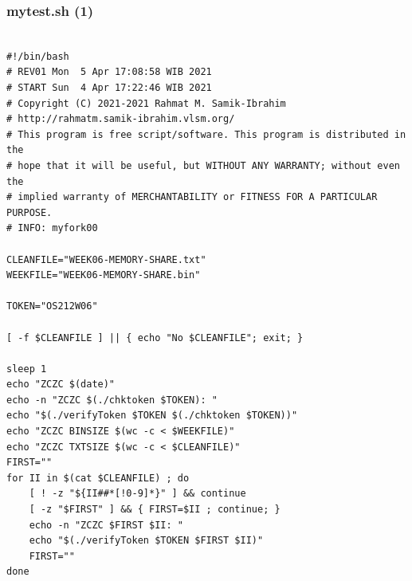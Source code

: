 \documentclass[xcolor=table, notheorems, hyperref={pdfpagelabels=false}]{beamer}
\begin{document}
\begin{frame}[fragile]
\frametitle{mytest.sh (1)}
\begin{lstlisting}[basicstyle=\ttfamily\tiny]         % 108

#!/bin/bash
# REV01 Mon  5 Apr 17:08:58 WIB 2021
# START Sun  4 Apr 17:22:46 WIB 2021
# Copyright (C) 2021-2021 Rahmat M. Samik-Ibrahim
# http://rahmatm.samik-ibrahim.vlsm.org/
# This program is free script/software. This program is distributed in the 
# hope that it will be useful, but WITHOUT ANY WARRANTY; without even the 
# implied warranty of MERCHANTABILITY or FITNESS FOR A PARTICULAR PURPOSE.
# INFO: myfork00

CLEANFILE="WEEK06-MEMORY-SHARE.txt"
WEEKFILE="WEEK06-MEMORY-SHARE.bin"

TOKEN="OS212W06"

[ -f $CLEANFILE ] || { echo "No $CLEANFILE"; exit; }

sleep 1
echo "ZCZC $(date)"
echo -n "ZCZC $(./chktoken $TOKEN): "
echo "$(./verifyToken $TOKEN $(./chktoken $TOKEN))"
echo "ZCZC BINSIZE $(wc -c < $WEEKFILE)"
echo "ZCZC TXTSIZE $(wc -c < $CLEANFILE)"
FIRST=""
for II in $(cat $CLEANFILE) ; do
    [ ! -z "${II##*[!0-9]*}" ] && continue
    [ -z "$FIRST" ] && { FIRST=$II ; continue; }
    echo -n "ZCZC $FIRST $II: "
    echo "$(./verifyToken $TOKEN $FIRST $II)"
    FIRST=""
done

\end{lstlisting}
\end{frame}
\end{document}
